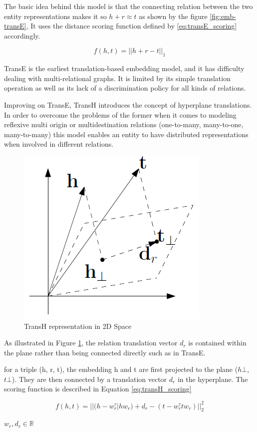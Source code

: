 The basic idea behind this model is that the connecting relation between the two entity representations makes it so  $h + r \approx t$ as shown by the figure \ref{fig:emb-transE}, It uses the distance scoring function defined by \ref{eq:transE_scoring} accordingly.

\begin{equation}
    \label{eq:transE_scoring}
    f (h, t) = ||h + r - t||_1
\end{equation}
    
TransE is the earliest translation-based embedding model, and it has difficulty dealing with multi-relational graphs. It is limited by its simple translation operation as well as its lack of a discrimination policy for all kinds of relations.

Improving on TransE, TransH \cite{wang2014knowledge} introduces the concept of hyperplane translations. In order to overcome the problems of the former when it comes to modeling reflexive multi origin or multidestination relations (one-to-many, many-to-one, many-to-many) this model enables an entity to have distributed representations when involved in different relations. 

\begin{figure}[!htp]
    \centering
    \includegraphics[width=.4\textwidth]{fig/embeddings/TransH.png}
    \caption{TransH \cite{wang2014knowledge} representation in 2D Space}
    \label{fig:emb-transH}
\end{figure}

As illustrated in Figure \ref{fig:emb-transH}, the relation translation vector $d_r$ is contained within the plane rather than being connected directly such as in TransE.

for a triple (h, r, t), the embedding h and t are first projected to the plane ($h\bot$, $t\bot$). They are then connected by a translation vector $d_r$ in the hyperplane. The scoring function is described in Equation \ref{eq:transH_scoring}

\begin{equation}
    \label{eq:transH_scoring}
    f (h, t) = || (h - w^\tau_r |hw_r) + d_r - (t-w^\tau_r tw_r) ||^2_2
\end{equation}
\begin{center}
    $w_r, d_r \in \mathbb{R}$
\end{center}

